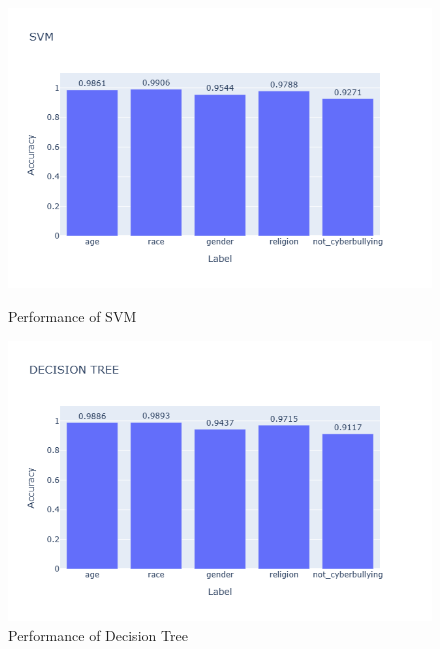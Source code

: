 \documentclass[pdflatex,sn-mathphys-num]{sn-jnl}%
\theoremstyle{thmstyleone}%
\theoremstyle{thmstyletwo}%
\theoremstyle{thmstylethree}%
\begin{document}
\begin{figure}[H]
    \begin{minipage}{0.48\textwidth}
        \centering
        \includegraphics[width=\textwidth]{Graphs/SVM.png}
        \caption{Performance of SVM}
        \label{fig:svm}
    \end{minipage}
    \hfill
    \begin{minipage}{0.48\textwidth}
        \centering
        \includegraphics[width=\textwidth]{Graphs/DECISION TREE.png}
        \caption{Performance of Decision Tree}
        \label{fig:decision_tree}
    \end{minipage}
\end{figure}
\end{document}
